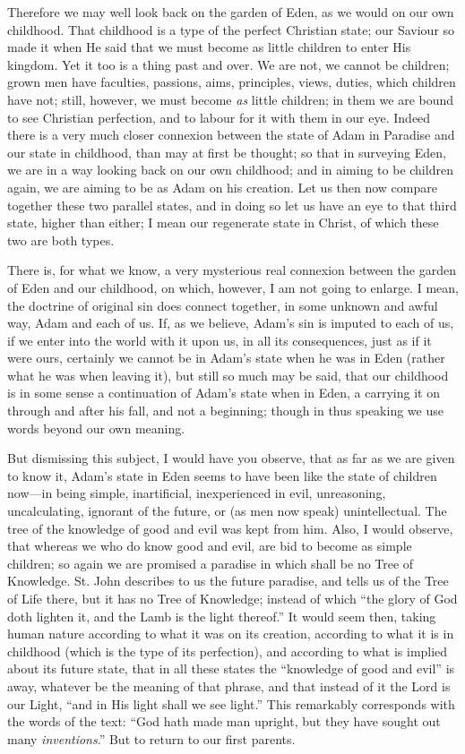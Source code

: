 Therefore we may well look back on the garden of Eden, as we would
on our own childhood. That childhood is a type of the perfect
Christian state; our Saviour so made it when He said that we must
become as little children to enter His kingdom. Yet it too is a thing
past and over. We are not, we cannot be children; grown men have
faculties, passions, aims, principles, views, duties, which children
have not; still, however, we must become \emph{as} little children; in them
we are bound to see Christian perfection, and to labour for it with
them in our eye. Indeed there is a very much closer connexion between
the state of Adam in Paradise and our state in childhood, than may at
first be thought; so that in surveying Eden, we are in a way looking
back on our own childhood; and in aiming to be children again, we are
aiming to be as Adam on his creation. Let us then now compare together
these two parallel states, and in doing so let us have an eye to that
third state, higher than either; I mean our regenerate state in
Christ, of which these two are both types.

There is, for what we know, a very mysterious real connexion
between the garden of Eden and our childhood, on which, however, I am
not going to enlarge. I mean, the doctrine of original sin does
connect together, in some unknown and awful way, Adam and each of us.
If, as we believe, Adam's sin is imputed to each of us, if we enter
into the world with it upon us, in all its consequences, just as if it
were ours, certainly we cannot be in Adam's state when he was in Eden
(rather what he was when leaving it), but still so much may be said,
that our childhood is in some sense a continuation of Adam's state
when in Eden, a carrying it on through and after his fall, and not a
beginning; though in thus speaking we use words beyond our own
meaning.

But dismissing this subject, I would have you observe, that as far
as we are given to know it, Adam's state in Eden seems to have been
like the state of children now—in being simple, inartificial,
inexperienced in evil, unreasoning, uncalculating, ignorant of the
future, or (as men now speak) unintellectual. The tree of the
knowledge of good and evil was kept from him. Also, I would observe,
that whereas we who do know good and evil, are bid to become as simple
children; so again we are promised a paradise in which shall be no
Tree of Knowledge. St. John describes to us the future paradise, and
tells us of the Tree of Life there, but it has no Tree of Knowledge;
instead of which ``the glory of God doth lighten it, and the Lamb is the
light thereof.'' It would seem then, taking human nature according
to what it was on its creation, according to what it is in childhood
(which is the type of its perfection), and according to what is
implied about its future state, that in all these states the
``knowledge of good and evil'' is away, whatever be the
meaning of that phrase, and that instead of it the Lord is our Light,
``and in His light shall we see light.'' This remarkably
corresponds with the words of the text: ``God hath made man
upright, but they have sought out many \emph{inventions}.'' But to
return to our first parents.

